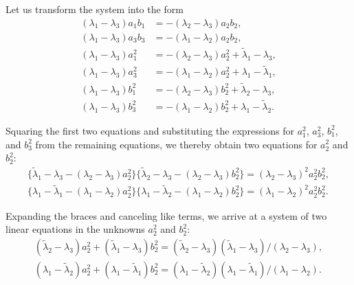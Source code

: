\documentclass[11pt,oneside]{book}
\begin{document}
Let us transform the system into the form
\[
\begin{aligned}
(\lambda_1 - \lambda_3) a_1 b_1 &= -(\lambda_2 - \lambda_3) a_2 b_2, \\
(\lambda_1 - \lambda_3) a_3 b_3 &= -(\lambda_1 - \lambda_2) a_2 b_2, \\
(\lambda_1 - \lambda_3) a_1^2 &= -(\lambda_2 - \lambda_3) a_2^2 + \tilde{\lambda}_1 - \lambda_3, \\
(\lambda_1 - \lambda_3) a_3^2 &= -(\lambda_1 - \lambda_2) a_2^2 + \lambda_1 - \tilde{\lambda}_1, \\
(\lambda_1 - \lambda_3) b_1^2 &= -(\lambda_2 - \lambda_3) b_2^2 + \tilde{\lambda}_2 - \lambda_3, \\
(\lambda_1 - \lambda_3) b_3^2 &= -(\lambda_1 - \lambda_2) b_2^2 + \lambda_1 - \tilde{\lambda}_2.
\end{aligned}
\]

Squaring the first two equations and substituting the expressions for $a_1^2$, $a_3^2$, $b_1^2$, and $b_3^2$ from the remaining equations, we thereby obtain two equations for $a_2^2$ and $b_2^2$:
\begin{gather*}
\bigl\{\tilde{\lambda}_1 - \lambda_3 - (\lambda_2 - \lambda_3) a_2^2\bigr\}\bigl\{\tilde{\lambda}_2 - \lambda_3 - (\lambda_2 - \lambda_3) b_2^2\bigr\} = (\lambda_2 - \lambda_3)^2 a_2^2 b_2^2, \\
\bigl\{\lambda_1 - \tilde{\lambda}_1 - (\lambda_1 - \lambda_2) a_2^2\bigr\}\bigl\{\lambda_1 - \tilde{\lambda}_2 - (\lambda_1 - \lambda_2) b_2^2\bigr\} = (\lambda_1 - \lambda_2)^2 a_2^2 b_2^2.
\end{gather*}

Expanding the braces and canceling like terms, we arrive at a system of two linear equations in the unknowns $a_2^2$ and $b_2^2$:
\begin{gather*}
(\tilde{\lambda}_2 - \lambda_3) a_2^2 + (\tilde{\lambda}_1 - \lambda_3) b_2^2 = (\tilde{\lambda}_2 - \lambda_3)(\tilde{\lambda}_1 - \lambda_3) / (\lambda_2 - \lambda_3), \\
(\lambda_1 - \tilde{\lambda}_2) a_2^2 + (\lambda_1 - \tilde{\lambda}_1) b_2^2 = (\lambda_1 - \tilde{\lambda}_2)(\lambda_1 - \tilde{\lambda}_1) / (\lambda_1 - \lambda_2).
\end{gather*}
\end{document}

